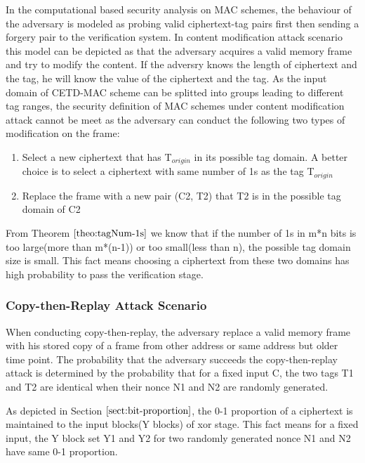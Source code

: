 In the computational based security analysis on MAC schemes, the behaviour of the adversary is modeled as probing valid ciphertext-tag pairs first then sending a forgery pair to the verification system. In content modification attack scenario this model can be depicted as that the adversary acquires a valid memory frame and try to modify the content. If the adversry knows the length of ciphertext and the tag, he will know the value of the ciphertext and the tag. 
As the input domain of CETD-MAC scheme can be splitted into groups leading to different tag ranges, the security definition of MAC schemes under content modification attack cannot be meet as the adversary can conduct the following two types of modification on the frame:
\begin{enumerate}
	\item Select a new ciphertext that has T$_{origin}$ in its possible tag domain. A better choice is to select a ciphertext with same number of 1s as the tag T$_{origin}$
	\item Replace the frame with a new pair (C2, T2) that T2 is in the possible tag domain of C2
\end{enumerate}
From Theorem $\ref{theo:tagNum-1s}$ we know that if the number of 1s in m*n bits is too large(more than m*(n-1)) or too small(less than n), the possible tag domain size is small. This fact means choosing a ciphertext from these two domains has high probability to pass the verification stage.

\subsubsection{Copy-then-Replay Attack Scenario}

When conducting copy-then-replay, the adversary replace a valid memory frame with his stored copy of a frame from other address or same address but older time point. The probability that the adversary succeeds the copy-then-replay attack is determined by the probability that for a fixed input C, the two tags T1 and T2 are identical when their nonce N1 and N2 are randomly generated.

As depicted in Section $\ref{sect:bit-proportion}$, the 0-1 proportion of a ciphertext is maintained to the input blocks(Y blocks) of xor stage. This fact means for a fixed input, the Y block set Y1 and Y2 for two randomly generated nonce N1 and N2 have same 0-1 proportion.  
